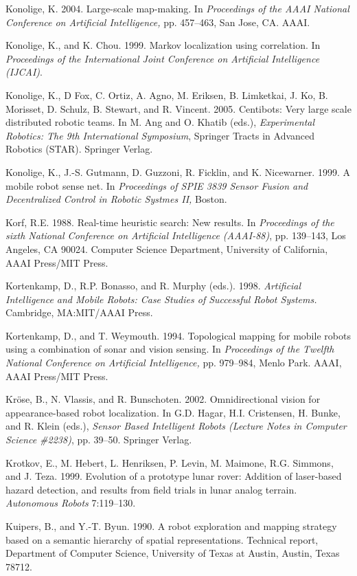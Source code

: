 \documentclass[10pt,a4paper]{article}
\begin{document}
Konolige, K. 2004. Large-scale map-making. In \textit{Proceedings of the AAAI National
Conference on Artificial Intelligence,} pp. 457–463, San Jose, CA. AAAI.

Konolige, K., and K. Chou. 1999. Markov localization using correlation. In \textit{Proceedings
of the International Joint Conference on Artificial Intelligence (IJCAI)}.

Konolige, K., D Fox, C. Ortiz, A. Agno, M. Eriksen, B. Limketkai, J. Ko, B. Morisset,
D. Schulz, B. Stewart, and R. Vincent. 2005. Centibots: Very large scale distributed
robotic teams. In M. Ang and O. Khatib (eds.), \textit{Experimental Robotics: The 9th International
Symposium}, Springer Tracts in Advanced Robotics (STAR). Springer Verlag.

Konolige, K., J.-S. Gutmann, D. Guzzoni, R. Ficklin, and K. Nicewarner. 1999. A
mobile robot sense net. In \textit{Proceedings of SPIE 3839 Sensor Fusion and Decentralized
Control in Robotic Systmes II,} Boston.

Korf, R.E. 1988. Real-time heuristic search: New results. In \textit{Proceedings of the sixth
National Conference on Artificial Intelligence (AAAI-88)}, pp. 139–143, Los Angeles, CA
90024. Computer Science Department, University of California, AAAI Press/MIT
Press.

Kortenkamp, D., R.P. Bonasso, and R. Murphy (eds.). 1998. \textit{Artificial Intelligence and
Mobile Robots: Case Studies of Successful Robot Systems.} Cambridge, MA:MIT/AAAI
Press.

Kortenkamp, D., and T. Weymouth. 1994. Topological mapping for mobile robots
using a combination of sonar and vision sensing. In \textit{Proceedings of the Twelfth National
Conference on Artificial Intelligence,} pp. 979–984, Menlo Park. AAAI, AAAI
Press/MIT Press.

Kröse, B., N. Vlassis, and R. Bunschoten. 2002. Omnidirectional vision for
appearance-based robot localization. In G.D. Hagar, H.I. Cristensen, H. Bunke,
and R. Klein (eds.), \textit{Sensor Based Intelligent Robots (Lecture Notes in Computer Science
\#2238)}, pp. 39–50. Springer Verlag.

Krotkov, E., M. Hebert, L. Henriksen, P. Levin, M. Maimone, R.G. Simmons, and
J. Teza. 1999. Evolution of a prototype lunar rover: Addition of laser-based hazard
detection, and results from field trials in lunar analog terrain. \textit{Autonomous Robots}
7:119–130.

Kuipers, B., and Y.-T. Byun. 1990. A robot exploration and mapping strategy based
on a semantic hierarchy of spatial representations. Technical report, Department
of Computer Science, University of Texas at Austin, Austin, Texas 78712.
\end{document}
